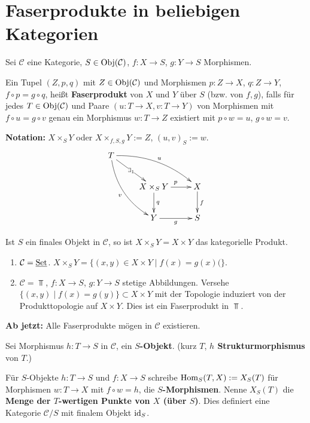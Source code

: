 \section{Faserprodukte in beliebigen Kategorien}

Sei $\mathcal{C}$ eine Kategorie, $S\in\operatorname{Obj}(\mathcal{C})$, $f:X\rightarrow S$,
$g:Y\rightarrow S$ Morphismen.
\begin{defn}[6]
  Ein Tupel $(Z,p,q)$ mit $Z\in\operatorname{Obj}(\mathcal{C})$ und Morphismen
  $p:Z\rightarrow X$, $q:Z\rightarrow Y$, $f\circ p=g\circ q$, hei{\small{}ßt
  }\textbf{\small{}Faserprodukt}{\small{} von $X$ und $Y$ über $S$
    (bzw. von $f,g$), falls für jedes $T\in\operatorname{Obj}(\mathcal{C})$ und Paare
    $(u:T\rightarrow X,v:T\rightarrow Y)$ von Morphismen mit $f\circ u=g\circ v$
    genau ein Morphismus $w:T\rightarrow Z$ existiert mit $p\circ w=u$,
    $g\circ w=v$.}{\small\par}
\end{defn}

\textbf{Notation:} $X\times_{S}Y$ oder $X\times_{f,S,g}Y:=Z$, $(u,v)_{S}:=w$.
\[
  \xymatrix{T\ar@/^{1pc}/[rrd]^{u}\ar@/_{1pc}/[ddr]_{v}\ar[dr]|-{\exists_{1}}\\
    & X\times_{S}Y\ar[r]^{p}\ar[d]^{q} & X\ar[d]^{f}\\
    & Y\ar[r]_{g} & S
  }
\]

Ist $S$ ein finales Objekt in $\mathcal{C}$, so ist $X\times_{S}Y=X\times Y$
das kategorielle Produkt.
\begin{example}[7]
  \mbox{}
  \begin{enumerate}
  \item $\mathcal{C}=\operatorname{\underline{Set}}$. $X\times_{S}Y=\{(x,y)\in X\times Y\mid f(x)=g(x)(\}$.
  \item $\mathcal{C}=\Top$, $f:X\rightarrow S$, $g:Y\rightarrow S$ stetige
    Abbildungen. Versehe $\{(x,y)\mid f(x)=g(y)\}\subset X\times Y$ mit
    der Topologie induziert von der Produkttopologie auf $X\times Y$.
    Dies ist ein Faserprodukt in $\Top$.
  \end{enumerate}
\end{example}

\textbf{Ab jetzt:} Alle Faserprodukte mögen in $\mathcal{C}$ existieren.

Sei Morphismus $h:T\rightarrow S$ in $\mathcal{C}$, ein \textbf{$S$-Objekt}.
(kurz $T$, \textbf{$h$ Strukturmorphismus} von $T$.)

Für $S$-Objekte $h:T\rightarrow S$ und $f:X\rightarrow S$ schreibe
$\operatorname{\mathrm{Hom}}_{S}(T,X):=X_{S}(T)$ für Morphismen $w:T\rightarrow X$ mit
$f\circ w=h$, die \textbf{$S$-Morphismen}. Nenne $X_{S}(T)$ die
\textbf{Menge der $T$-wertigen Punkte von $X$ (über $S$)}. Dies
definiert eine Kategorie $\mathcal{C}/S$ mit finalem Objekt $\operatorname{\mathrm{id}}_{S}$.

